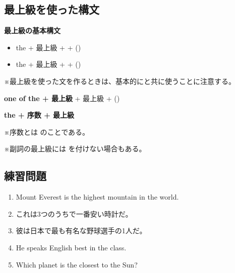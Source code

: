 \subsection{最上級を使った構文}
    \begin{theorembox}{\textbf{最上級の基本構文}}
        \begin{itemize}[nosep, leftmargin=1.5em]
            \item the + 最上級 + + ()
            \item the + 最上級 + + ()
        \end{itemize}
    \end{theorembox}

    ※最上級を使った文を作るときは、基本的にと共に使うことに注意する。

    \begin{theorembox}{\textbf{one of the + 最上級}}
         + 最上級 + ()
    \end{theorembox}

    \begin{theorembox}{\textbf{the + 序数 + 最上級}}
    \end{theorembox}

    ※序数とは  のことである。
    \vspace{0.5em}

    ※副詞の最上級には を付けない場合もある。

\subsection{練習問題}
    \begin{enumerate}[leftmargin=*, nosep, itemsep=2.0em]
        \item Mount Everest is the highest mountain in the world.
        \item これは3つのうちで一番安い時計だ。
        \item 彼は日本で最も有名な野球選手の1人だ。
        \item He speaks English best in the class.
        \item Which planet is the closest to the Sun?
    \end{enumerate}

\newpage
